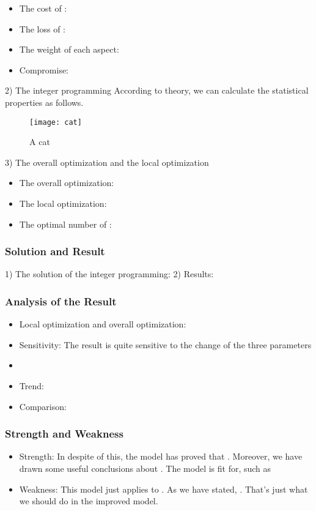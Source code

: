 \documentclass{tzmcmthesis}
\begin{document}
\begin{itemize}
\item The cost of       :
\item The loss of       :
\item The weight of each aspect:
\item Compromise:
\end{itemize}


2) The integer programming
According to       theory, we can calculate the statistical properties as follows.

\begin{figure}[!ht]
  \centering
  \texttt{[image: cat]}
  \caption{A cat}\label{cat1}
\end{figure}



3) The overall optimization and the local optimization

\begin{itemize}
\item The overall optimization:
\item The local optimization:
\item The optimal number of        :
\end{itemize}



\subsubsection{Solution and Result}
1) The solution of the integer programming:
2) Results:
\subsubsection{Analysis of the Result}
\begin{itemize}
\item Local optimization and overall optimization:
\item Sensitivity: The result is quite sensitive to the change of the three parameters
\item
\item Trend:
\item Comparison:
\end{itemize}
\subsubsection{Strength and Weakness}
\begin{itemize}
\item Strength: In despite of this, the model has proved that .  Moreover, we have drawn some useful conclusions about   . The model is fit for, such as
\item Weakness: This model just applies to   . As we have stated,   . That’s just what we should do in the improved model.
\end{itemize}
\end{document}
